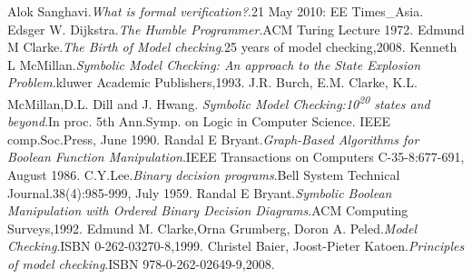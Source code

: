 \documentclass[12pt]{report}
\begin{document}
\begin{thebibliography}{99}
 Alok Sanghavi.\textit{What is formal verification?}.21 May 2010: EE Times\_Asia.
 Edsger W. Dijkstra.\textit{The Humble Programmer}.ACM Turing Lecture 1972.
 Edmund M Clarke.\textit{The Birth of Model checking}.25 years of model checking,2008.
 Kenneth L McMillan.\textit{Symbolic Model Checking: An approach to the State Explosion Problem}.kluwer Academic Publishers,1993.
 J.R. Burch, E.M. Clarke, K.L. McMillan,D.L. Dill and J. Hwang. \textit{Symbolic Model Checking:10\textsuperscript{20} states and beyond}.In proc. 5th Ann.Symp. on Logic in Computer Science. IEEE comp.Soc.Press, June 1990.
 Randal E Bryant.\textit{Graph-Based Algorithms for Boolean Function Manipulation}.IEEE Transactions on Computers C-35-8:677-691, August 1986.
 C.Y.Lee.\textit{Binary decision programs}.Bell System Technical Journal.38(4):985-999, July 1959.
 Randal E Bryant.\textit{Symbolic Boolean Manipulation with Ordered Binary Decision Diagrams}.ACM Computing Surveys,1992.
Edmund M. Clarke,Orna Grumberg, Doron A. Peled.\textit{Model Checking}.ISBN 0-262-03270-8,1999.
 Christel Baier, Joost-Pieter Katoen.\textit{Principles of model checking}.ISBN 978-0-262-02649-9,2008.
\end{thebibliography}
\end{document}

